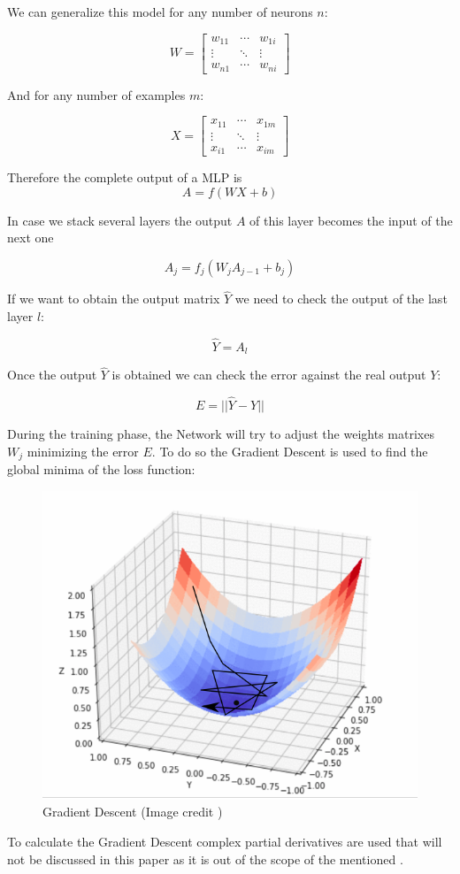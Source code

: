 We can generalize this model for any number of neurons $n$:

$$
W=\left[
\begin{array}{ccc}
   w_{11} & \cdots & w_{1i} \\
   \vdots & \ddots & \vdots \\
   w_{n1} & \cdots & w_{ni}
\end{array}
\right]
$$

And for any number of examples $m$:

$$
X=\left[
\begin{array}{ccc}
   x_{11} & \cdots & x_{1m} \\
   \vdots & \ddots & \vdots \\
   x_{i1} & \cdots & x_{im}
\end{array}
\right]
$$

Therefore the complete output of a MLP is
$$ A = f(WX + b) $$


In case we stack several layers the output $A$ of this layer becomes the input of the next one

$$ A_j = f_j(W_jA_{j-1} + b_j) $$

If we want to obtain the output matrix $\hat{Y}$ we need to check the output of the last layer $l$:

$$ \hat{Y} = A_l $$

Once the output $\hat{Y}$ is obtained we can check the error against the real output $Y$:

$$ E = || \hat{Y} - Y || $$

During the training phase, the Network will try to adjust the weights matrixes $W_j$ minimizing the error $E$.
To do so the Gradient Descent is used to find the global minima of the loss function:

\begin{figure}[th]
    \centering
    \includegraphics[width=1.0\textwidth]{Figures/GDescent.png}
    \decoRule
    \caption[Gradient Descent]{Gradient Descent (Image credit \cite{mathann})}
    \label{fig:Gradient Descent}
\end{figure}

To calculate the Gradient Descent complex partial derivatives are used that will not be discussed in this paper as it is out of the scope of the mentioned \cite{Suykens1996} \cite{Werbos1990}.